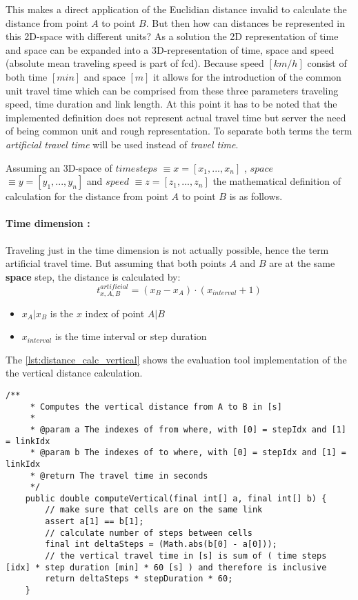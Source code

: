 This makes a direct application of the Euclidian distance invalid to calculate the distance from point $A$ to point $B$. But then how can distances be represented in this 2D-space with different units? As a solution the 2D representation of time and space can be expanded into a 3D-representation of time, space and speed (absolute mean traveling speed is part of \acrshort{fcd}). Because speed $[km/h]$ consist of both time $[min]$ and space $[m]$ it allows for the introduction of the common unit travel time which can be comprised from these three parameters traveling speed, time duration and link length. At this point it has to be noted that the implemented definition does not represent actual travel time but server the need of being common unit and rough representation. To separate both terms the term \textit{artificial travel time} will be used instead of \textit{travel time}.

Assuming an 3D-space of $time steps$ $\equiv x=[x_1,...,x_n]$ , $space$ $\equiv y=[y_1,...,y_n]$ and $speed$ $\equiv z=[z_1,...,z_n]$ the mathematical definition of calculation for the distance from point $A$ to point $B$ is as follows.

\paragraph{Time dimension :} Traveling just in the time dimension is not actually possible, hence the term artificial travel time. But assuming that both points $A$ and $B$ are at the same \textbf{space} step, the distance is calculated by:
\begin{equation}
	t_{x,A,B}^{artificial} = (x_B - x_A) \cdot ( x_{interval} + 1 )
	\label{equation_t_v_time}
\end{equation}
\begin{itemize}
	\setlength\itemsep{0.1em}	
	\item[] $x_A | x_B$ is the $x$ index of point $A | B$
	\item[] $x_{interval}$ is the time interval or step duration
\end{itemize}

The \cref{lst:distance_calc_vertical} shows the evaluation tool implementation of the the vertical distance calculation.
\begin{lstlisting}[basicstyle=\tiny, style=java, caption={Implementation of \textit{vertical distance calculation}}, label=lst:distance_calc_vertical] 
    /**
     * Computes the vertical distance from A to B in [s]
     *
     * @param a The indexes of from where, with [0] = stepIdx and [1] = linkIdx
     * @param b The indexes of to where, with [0] = stepIdx and [1] = linkIdx
     * @return The travel time in seconds
     */
    public double computeVertical(final int[] a, final int[] b) {
        // make sure that cells are on the same link
        assert a[1] == b[1];
        // calculate number of steps between cells
        final int deltaSteps = (Math.abs(b[0] - a[0]));
        // the vertical travel time in [s] is sum of ( time steps [idx] * step duration [min] * 60 [s] ) and therefore is inclusive
        return deltaSteps * stepDuration * 60;
    }
\end{lstlisting}

